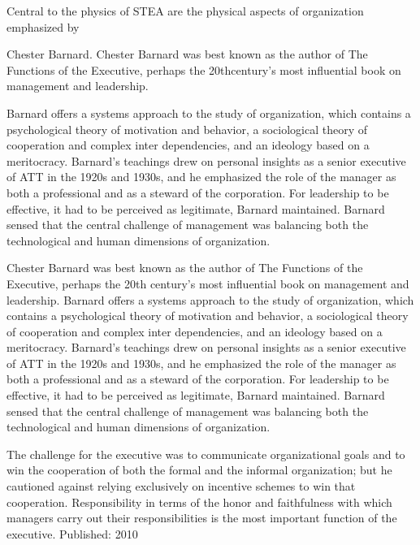 Central to the physics of  STEA are the physical aspects of organization emphasized by 

Chester Barnard. Chester Barnard was best known as the author of The Functions of the Executive, perhaps the 20thcentury’s most influential book on management and leadership. 

Barnard offers a systems approach to the study of organization, which contains a psychological theory of motivation and behavior, a sociological theory of cooperation and complex inter dependencies, and an ideology based on a meritocracy. Barnard’s teachings drew on personal insights as a senior executive of ATT in the 1920s and 1930s, and he emphasized the role of the manager as both a professional and as a steward of the corporation. For leadership to be effective, it had to be perceived as legitimate, Barnard maintained. Barnard sensed that the central challenge of management was balancing both the technological and human dimensions of organization.

Chester Barnard was best known as the author of The Functions of the Executive, perhaps the 20th century’s most influential book on management and leadership. Barnard offers a systems approach to the study of organization, which contains a psychological theory of motivation and behavior, a sociological theory of cooperation and complex inter dependencies, and an ideology based on a meritocracy. Barnard’s teachings drew on personal insights as a senior executive of ATT in the 1920s and 1930s, and he emphasized the role of the manager as both a professional and as a steward of the corporation. For leadership to be effective, it had to be perceived as legitimate, Barnard maintained. Barnard sensed that the central challenge of management was balancing both the technological and human dimensions of organization.

The challenge for the executive was to communicate organizational goals and to win the cooperation of both the formal and the informal organization; but he cautioned against relying exclusively on incentive schemes to win that cooperation. Responsibility in terms of the honor and faithfulness with which managers carry out their responsibilities is the most important function of the executive. Published: 2010

